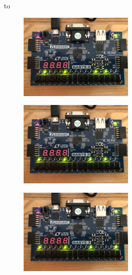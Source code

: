 to\documentclass[11pt]{article}
\begin{document}
\begin{figure}[H]
\begin{center}
	\includegraphics[width=0.5\textwidth]{./images/Part1/l9p1img2.jpg}
	\caption{\label{fig:part1_img2}}
\end{center}
\end{figure}

\begin{figure}[H]
\begin{center}
	\includegraphics[width=0.5\textwidth]{./images/Part1/l9p1img3.jpg}
	\caption{\label{fig:part1_img3}}
\end{center}
\end{figure}

\begin{figure}[H]
\begin{center}
	\includegraphics[width=0.5\textwidth]{./images/Part1/l9p1img4.jpg}
	\caption{\label{fig:part1_img4}}
\end{center}
\end{figure}
\end{document}
